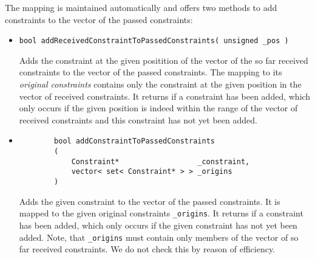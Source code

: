 The mapping is maintained automatically and offers two methods to add constraints to the vector
of the passed constraints:
\begin{itemize}
	\item \begin{verbatim}bool addReceivedConstraintToPassedConstraints( unsigned _pos )\end{verbatim}
		Adds the constraint at the given positition of the vector of the so far received constraints
		to the vector of the passed constraints. The mapping to its \emph{original constraints} contains
		only the constraint at the given position in the vector of received constraints. It returns
		\true if a constraint has been added, which only occurs if the given position is
		indeed within the range of the vector of received constraints and this constraint has not
		yet been added.
	\item
		\begin{verbatim}
		bool addConstraintToPassedConstraints
		(
		    Constraint*                  _constraint,
		    vector< set< Constraint* > > _origins
		)
		\end{verbatim}
		Adds the given constraint to the vector of the passed constraints. It is mapped to the given
		original constraints \texttt{\_origins}. It returns \true if a constraint has been
		added, which only occurs if the given constraint has not yet been added. Note, that
		\texttt{\_origins} must contain only members of the vector of so far received constraints. We
		do not check this by reason of efficiency.
\end{itemize}

